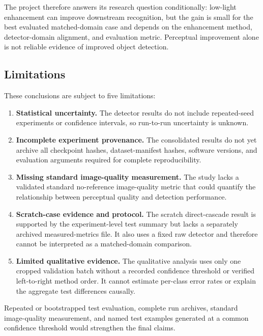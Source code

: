 \documentclass[11pt,a4paper]{article}
\begin{document}
The project therefore answers its research question conditionally: low-light
enhancement can improve downstream recognition, but the gain is small for the
best evaluated matched-domain case and depends on the enhancement method,
detector-domain alignment, and evaluation metric. Perceptual improvement alone
is not reliable evidence of improved object detection.

\subsection{Limitations}

These conclusions are subject to five limitations:

\begin{enumerate}[leftmargin=*, label=\textbf{L\arabic*:}]
    \item \textbf{Statistical uncertainty.} The detector results do not include
    repeated-seed experiments or confidence intervals, so run-to-run
    uncertainty is unknown.

    \item \textbf{Incomplete experiment provenance.} The consolidated results
    do not yet archive all checkpoint hashes, dataset-manifest hashes, software
    versions, and evaluation arguments required for complete reproducibility.

    \item \textbf{Missing standard image-quality measurement.} The study lacks
    a validated standard no-reference image-quality metric that could quantify
    the relationship between perceptual quality and detection performance.

    \item \textbf{Scratch-case evidence and protocol.} The scratch
    direct-cascade result is supported by the experiment-level test summary but
    lacks a separately archived measured-metrics file. It also uses a fixed raw
    detector and therefore cannot be interpreted as a matched-domain comparison.

    \item \textbf{Limited qualitative evidence.} The qualitative analysis uses
    only one cropped validation batch without a recorded confidence threshold
    or verified left-to-right method order. It cannot estimate per-class error
    rates or explain the aggregate test differences causally.
\end{enumerate}

Repeated or bootstrapped test evaluation, complete run archives, standard
image-quality measurement, and named test examples generated at a common
confidence threshold would strengthen the final claims.
\end{document}
